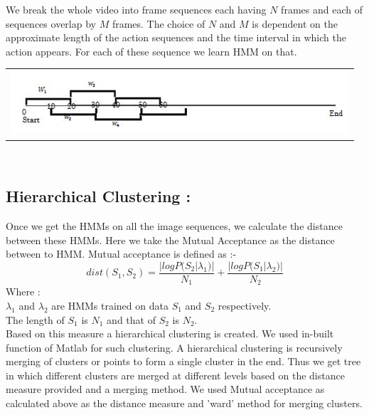 \def\DevnagVersion{2.15}\documentclass[a4paper, 10pt, notitlepage]{report}
\begin{document}
\begin{minipage}{0.4\textwidth}
\begin{flushleft} \large
We break the whole video into frame sequences each having $N$ frames and each of sequences overlap by $M$ frames. The choice of $N$ and $M$ is dependent on the approximate length of the action sequences and the time interval in which the action appears. For each of these sequence we learn HMM on that.

\end{flushleft}
\end{minipage}
\begin{minipage}{0.4\textwidth}
\begin{flushright} \large

\center
\begin{tabular}{c}
\includegraphics[scale=0.5]{interval.png}
\end{tabular}
\label{tab:gt}

\end{flushright}
\end{minipage}\\[3cm]

\subsection{Hierarchical Clustering :}
Once we get the HMMs on all the image sequences, we calculate the distance between these HMMs. Here we take the Mutual Acceptance as the distance between to HMM. Mutual acceptance is defined as :-\\

$$dist(S_1, S_2) = \frac{|logP(S_2|\lambda _ 1)|}{N_1} +\frac{|logP(S_1|\lambda _ 2)|}{N_2} $$
Where : \\
\hspace*{20pt} $\lambda_1$ and $\lambda_2$ are HMMs trained on data $S_1$ and $S_2$ respectively.\\
\hspace*{20pt} The length of $S_1$ is $N_1$ and that of $S_2$ is $N_2$.\\

Based on this measure a hierarchical clustering is created. We used in-built function of Matlab for such clustering. A hierarchical clustering is recursively merging of clusters or points to form a single cluster in the end. Thus we get tree in which different clusters are merged at different levels based on the distance measure provided and a merging method. We used Mutual acceptance as calculated above as the distance measure and 'ward' method for merging clusters.
\end{document}
